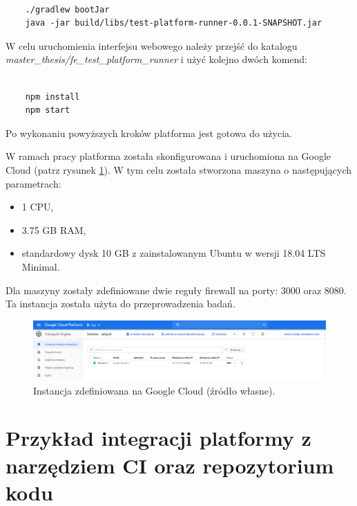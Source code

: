 {\selectfont
\tiny
\begin{lstlisting}

    ./gradlew bootJar
    java -jar build/libs/test-platform-runner-0.0.1-SNAPSHOT.jar

\end{lstlisting}
}

W celu uruchomienia interfejsu webowego należy przejść do katalogu \newline \textit{master\_thesis/fe\_test\_platform\_runner} i użyć kolejno dwóch komend:

{\selectfont
\tiny
\begin{lstlisting}

    npm install
    npm start

\end{lstlisting}
}

Po wykonaniu powyższych kroków platforma jest gotowa do użycia.

W ramach pracy platforma została skonfigurowana i uruchomiona na Google Cloud (patrz rysunek \ref{fig:google_cloud}).
W tym celu została stworzona maszyna o następujących parametrach:
\begin{itemize}
    \item 1 CPU,
    \item 3.75 GB RAM,
    \item standardowy dysk 10 GB z zainstalowanym Ubuntu w wersji 18.04 LTS Minimal.
\end{itemize}
Dla maszyny zostały zdefiniowane dwie reguły firewall na porty: 3000 oraz 8080.
Ta instancja została użyta do przeprowadzenia badań.

\begin{figure}[h]
    \centering
    \includegraphics[width = 12cm]{chapter05/google_cloud.png}
    \caption{Instancja zdefiniowana na Google Cloud (źródło własne).}
    \label{fig:google_cloud}
\end{figure}

\section {Przykład integracji platformy z narzędziem CI oraz repozytorium kodu}
\label{ci-integration}

